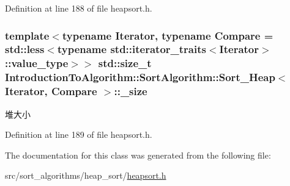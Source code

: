 Definition at line 188 of file heapsort.\+h.

\hypertarget{class_introduction_to_algorithm_1_1_sort_algorithm_1_1_sort___heap_a7d35f22bc361d54b1665e0fbfe37e2d5}{}
\subsubsection[{\+\_\+size}]{\setlength{\rightskip}{0pt plus 5cm}template$<$typename Iterator, typename Compare = std\+::less$<$typename std\+::iterator\+\_\+traits$<$\+Iterator$>$\+::value\+\_\+type$>$$>$ std\+::size\+\_\+t {\bf Introduction\+To\+Algorithm\+::\+Sort\+Algorithm\+::\+Sort\+\_\+\+Heap}$<$ Iterator, Compare $>$\+::\+\_\+size\hspace{0.3cm}{\ttfamily [private]}}\label{class_introduction_to_algorithm_1_1_sort_algorithm_1_1_sort___heap_a7d35f22bc361d54b1665e0fbfe37e2d5}
堆大小 

Definition at line 189 of file heapsort.\+h.



The documentation for this class was generated from the following file\+:\begin{DoxyCompactItemize}
\item 
src/sort\+\_\+algorithms/heap\+\_\+sort/\hyperlink{heapsort_8h}{heapsort.\+h}\end{DoxyCompactItemize}
